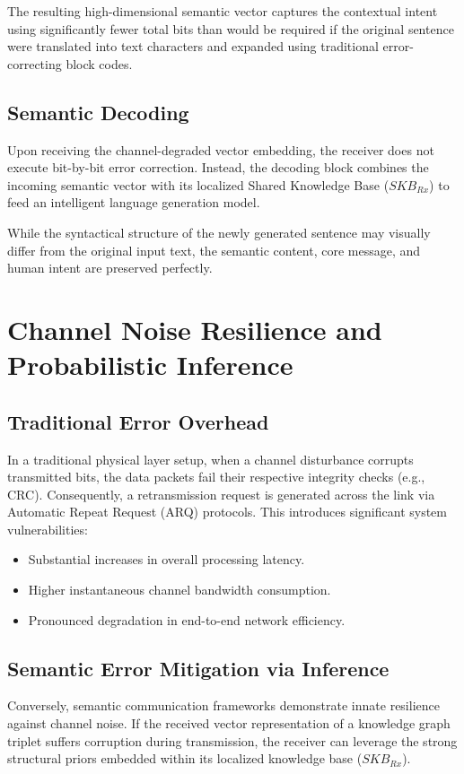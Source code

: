 \documentclass[10pt, conference]{IEEEtran}
\begin{document}
The resulting high-dimensional semantic vector captures the contextual intent using significantly fewer total bits than would be required if the original sentence were translated into text characters and expanded using traditional error-correcting block codes.

\subsection{\textbf{Semantic Decoding}}
Upon receiving the channel-degraded vector embedding, the receiver does not execute bit-by-bit error correction. Instead, the decoding block combines the incoming semantic vector with its localized Shared Knowledge Base ($SKB_{Rx}$) to feed an intelligent language generation model. 

While the syntactical structure of the newly generated sentence may visually differ from the original input text, the semantic content, core message, and human intent are preserved perfectly.

\section{\large \textbf{Channel Noise Resilience and Probabilistic Inference}}

\subsection{\textbf{Traditional Error Overhead}}
In a traditional physical layer setup, when a channel disturbance corrupts transmitted bits, the data packets fail their respective integrity checks (e.g., CRC). Consequently, a retransmission request is generated across the link via Automatic Repeat Request (ARQ) protocols. This introduces significant system vulnerabilities:
\begin{itemize}
    \item Substantial increases in overall processing latency.
    \item Higher instantaneous channel bandwidth consumption.
    \item Pronounced degradation in end-to-end network efficiency.
\end{itemize}

\subsection{\textbf{Semantic Error Mitigation via Inference}}
Conversely, semantic communication frameworks demonstrate innate resilience against channel noise. If the received vector representation of a knowledge graph triplet suffers corruption during transmission, the receiver can leverage the strong structural priors embedded within its localized knowledge base ($SKB_{Rx}$).
\end{document}
